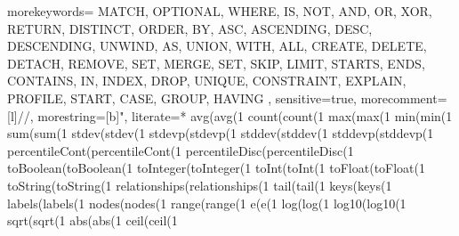 \usepackage{listings}



{
	morekeywords={
		MATCH, OPTIONAL, WHERE, IS, NOT, AND, OR, XOR, RETURN, DISTINCT, ORDER, BY, ASC, ASCENDING, DESC, DESCENDING, UNWIND, AS, UNION, WITH, ALL, CREATE, DELETE, DETACH, REMOVE, SET, MERGE, SET, SKIP, LIMIT,
		STARTS, ENDS, CONTAINS,
		IN,
		INDEX, DROP, UNIQUE, CONSTRAINT, EXPLAIN, PROFILE, START, CASE,
		GROUP, HAVING
	},
	sensitive=true,
	morecomment=[l]{//},
	morestring=[b]{"},
	literate=*
		{avg(}{\textcolor{functioncolor}{avg}(}{1}%
		{count(}{\textcolor{functioncolor}{count}(}{1}%
		{max(}{\textcolor{functioncolor}{max}(}{1}%
		{min(}{\textcolor{functioncolor}{min}(}{1}%
		{sum(}{\textcolor{functioncolor}{sum}(}{1}%
		{stdev(}{\textcolor{functioncolor}{stdev}(}{1}%
		{stdevp(}{\textcolor{functioncolor}{stdevp}(}{1}%
		{stddev(}{\textcolor{functioncolor}{stddev}(}{1}%
		{stddevp(}{\textcolor{functioncolor}{stddevp}(}{1}%
		{percentileCont(}{\textcolor{functioncolor}{percentileCont}(}{1}%
		{percentileDisc(}{\textcolor{functioncolor}{percentileDisc}(}{1}%
		{toBoolean(}{\textcolor{functioncolor}{toBoolean}(}{1}%
		{toInteger(}{\textcolor{functioncolor}{toInteger}(}{1}%
		{toInt(}{\textcolor{functioncolor}{toInt}(}{1}%
		{toFloat(}{\textcolor{functioncolor}{toFloat}(}{1}%
		{toString(}{\textcolor{functioncolor}{toString}(}{1}%
		{relationships(}{\textcolor{functioncolor}{relationships}(}{1}%
		{tail(}{\textcolor{functioncolor}{tail}(}{1}%
		{keys(}{\textcolor{functioncolor}{keys}(}{1}%
		{labels(}{\textcolor{functioncolor}{labels}(}{1}%
		{nodes(}{\textcolor{functioncolor}{nodes}(}{1}%
		{range(}{\textcolor{functioncolor}{range}(}{1}%
		{e(}{\textcolor{functioncolor}{e}(}{1}%
		{log(}{\textcolor{functioncolor}{log}(}{1}%
		{log10(}{\textcolor{functioncolor}{log10}(}{1}%
		{sqrt(}{\textcolor{functioncolor}{sqrt}(}{1}%
		{abs(}{\textcolor{functioncolor}{abs}(}{1}%
		{ceil(}{\textcolor{functioncolor}{ceil}(}{1}%
}

